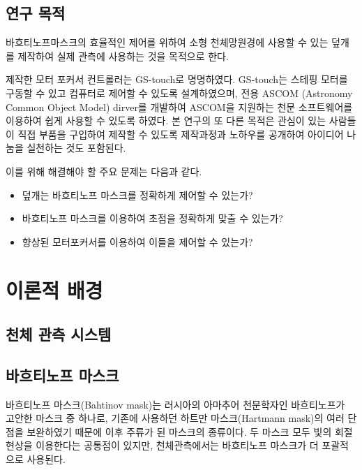 \documentclass[twoside,11pt]{gshs_thesis}
\begin{document}
\subsection{연구 목적}

바흐티노프마스크의 효율적인 제어를 위하여 소형 천체망원경에 사용할 수 있는 덮개를 제작하여 실제 관측에 사용하는 것을 목적으로 한다. 

제작한 모터 포커서 컨트롤러는 GS-touch로 명명하였다. GS-touch는 스테핑 모터를 구동할 수 있고 컴퓨터로 제어할 수 있도록 설계하였으며, 전용 ASCOM (Astronomy Common Object Model) dirver를 개발하여 ASCOM을 지원하는 천문 소프트웨어를 이용하여 쉽게 사용할 수 있도록 하였다.
본 연구의 또 다른 목적은 관심이 있는 사람들이 직접 부품을 구입하여 제작할 수 있도록 제작과정과 노하우를 공개하여 아이디어 나눔을 실천하는 것도 포함된다.


이를 위해 해결해야 할 주요 문제는 다음과 같다.

\begin{itemize}
\item{덮개는 바흐티노프 마스크를 정확하게 제어할 수 있는가?}\\[-34pt]
\item{바흐티노프 마스크를 이용하여 초점을 정확하게 맞출 수 있는가?}\\[-34pt]
\item{향상된 모터포커서를 이용하여 이들을 제어할 수 있는가?}
\end{itemize}

 	
\newpage
\section{이론적 배경}


\subsection{천체 관측 시스템}

\subsection{바흐티노프 마스크}

 바흐티노프 마스크(Bahtinov mask)는 러시아의 아마추어 천문학자인 바흐티노프가 고안한 마스크 중 하나로, 기존에 사용하던 하트만 마스크(Hartmann mask)의 여러 단점을 보완하였기 때문에 이후 주류가 된 마스크의 종류이다. 두 마스크 모두 빛의 회절 현상을 이용한다는 공통점이 있지만, 천체관측에서는 바흐티노프 마스크가 더 포괄적으로 사용된다. 
 
\end{document}
